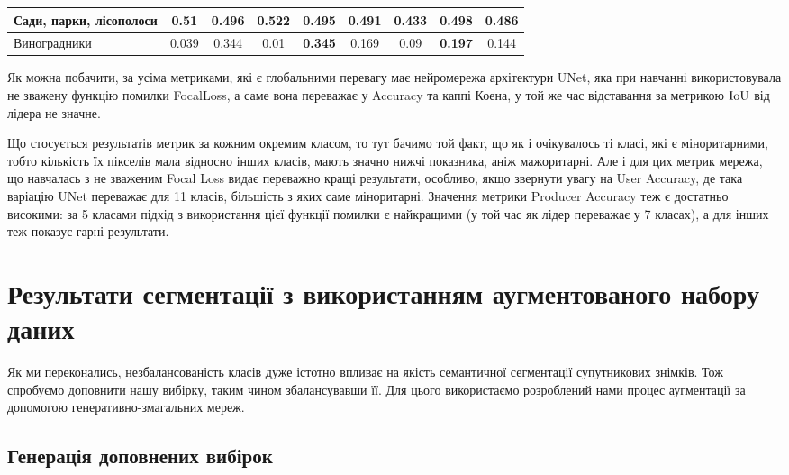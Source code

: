\begin{table}[!ht]
\begin{tabular}{|K|C|C|C|C|C|C|C|C|}
        \hline Сади, парки, лісополоси & 0.51                            & 0.496                           & \textbf{0.522} & 0.495          & 0.491          & 0.433          & \textbf{0.498} & 0.486          \\
        \hline Виноградники            & 0.039                           & 0.344                           & 0.01           & \textbf{0.345} & 0.169          & 0.09           & \textbf{0.197} & 0.144          \\
        \hline
    \end{tabular}
    \label{tab:segm_result_real_per_classes}
\end{table}

Як можна побачити, за усіма метриками, які є глобальними
перевагу має нейромережа архітектури UNet, яка
при навчанні використовувала не зважену функцію
помилки FocalLoss, а саме вона переважає у Accuracy та
каппі Коена, у той же час відставання за метрикою $\operatorname{IoU}$
від лідера не значне.

Що стосується результатів метрик за
кожним окремим класом, то тут бачимо той факт, що як і
очікувалось ті класі, які є міноритарними, тобто кількість їх
пікселів мала відносно інших класів, мають значно нижчі показника,
аніж мажоритарні. Але і для цих метрик мережа, що
навчалась з не зваженим Focal Loss видає переважно кращі
результати, особливо, якщо звернути увагу
на User Accuracy, де така варіацію UNet переважає
для 11 класів, більшість з яких саме міноритарні.
Значення метрики Producer Accuracy теж є достатньо
високими: за 5 класами підхід з використання цієї функції
помилки є найкращими (у той час як лідер переважає у
7 класах), а для інших теж показує гарні результати.

\section{Результати сегментації з використанням аугментованого набору даних}

Як ми переконались, незбалансованість класів дуже
істотно впливає на якість семантичної сегментації супутникових
знімків. Тож спробуємо доповнити нашу вибірку, таким чином збалансувавши її.
Для цього використаємо розроблений нами процес аугментації
за допомогою генеративно-змагальних мереж.

\subsection{Генерація доповнених вибірок}

